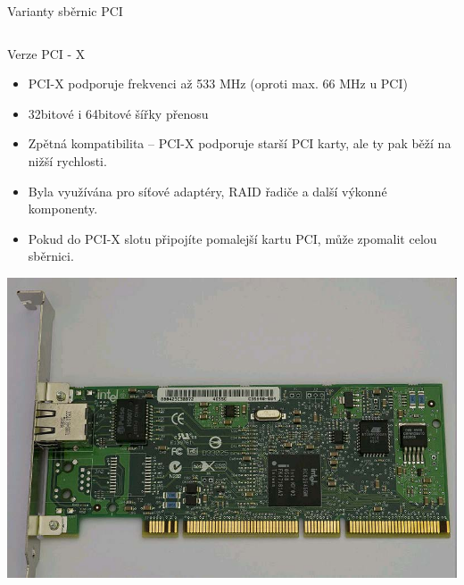\documentclass[aspectratio=43]{beamer}
\begin{document}
\begin{frame}{Varianty sběrnic PCI}
\begin{columns}
\begin{center}
        \end{center}
	\end{columns}
	 
\end{frame}

\begin{frame}{Verze PCI - X}
	\begin{itemize}
		\item PCI-X podporuje frekvenci až 533 MHz (oproti max. 66 MHz u PCI)
		\item 32bitové i 64bitové šířky přenosu
		\item Zpětná kompatibilita – PCI-X podporuje starší PCI karty, ale ty pak běží na nižší rychlosti.
		\item Byla využívána pro síťové adaptéry, RAID řadiče a další výkonné komponenty.
		\item Pokud do PCI-X slotu připojíte pomalejší kartu PCI, může zpomalit celou sběrnici.
	\end{itemize}
	 
	\begin{center}
		\includegraphics[width=0.5\linewidth]{extrahovane_obrazky/img_1_page16_3.jpeg}
	\end{center}
	
\end{frame}
\end{document}
